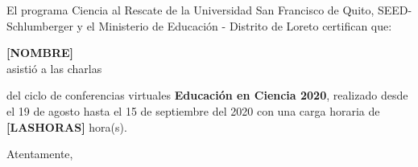 \documentclass{letter}[26pt]
\date{Quito, 18 de septiembre del 2020}
\begin{document}

\begin{letter}{El programa Ciencia al Rescate de la Universidad San Francisco de Quito,
    SEED-Schlumberger y el Ministerio de Educación - Distrito de Loreto
    certifican que: }

\opening{\vspace{0.5cm}}

{\centering \Huge \bf [NOMBRE]\\}
\vspace{0.5cm}
asistió a las charlas\\
\vspace{0.5cm}

\vspace{0.5cm}
del ciclo de conferencias virtuales {\bf Educación en Ciencia 2020},
realizado desde el 19 de agosto hasta el 15 de septiembre del 2020 con una
carga horaria de {\bf [LASHORAS]} hora(s).
\vspace{0.5cm}

\closing{Atentamente,}
\end{letter}
\end{document}
